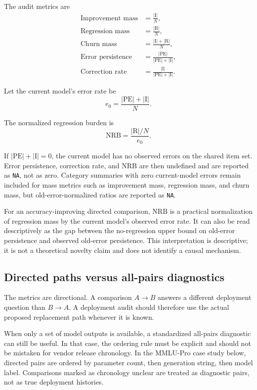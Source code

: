 \documentclass[manuscript, screen, review, nonacm]{jair}
\newcommand{\pe}{\mathrm{PE}}
\newcommand{\imp}{\mathrm{I}}
\newcommand{\reg}{\mathrm{R}}
\newcommand{\nrb}{\mathrm{NRB}}
\begin{document}
The audit metrics are
\begin{align}
\text{Improvement mass} &= \frac{|\imp|}{N}, \\
\text{Regression mass} &= \frac{|\reg|}{N}, \\
\text{Churn mass} &= \frac{|\imp|+|\reg|}{N}, \\
\text{Error persistence} &= \frac{|\pe|}{|\pe|+|\imp|}, \\
\text{Correction rate} &= \frac{|\imp|}{|\pe|+|\imp|}.
\end{align}

Let the current model's error rate be
\begin{equation}
 e_0 = \frac{|\pe|+|\imp|}{N}.
\end{equation}

The normalized regression burden is
\begin{equation}
 \nrb = \frac{|\reg|/N}{e_0}.
\end{equation}

If $|\pe|+|\imp|=0$, the current model has no observed errors on the shared item set. Error persistence, correction rate, and $\nrb$ are then undefined and are reported as \texttt{NA}, not as zero. Category summaries with zero current-model errors remain included for mass metrics such as improvement mass, regression mass, and churn mass, but old-error-normalized ratios are reported as \texttt{NA}.

For an accuracy-improving directed comparison, $\nrb$ is a practical normalization of regression mass by the current model's observed error rate. It can also be read descriptively as the gap between the no-regression upper bound on old-error persistence and observed old-error persistence. This interpretation is descriptive; it is not a theoretical novelty claim and does not identify a causal mechanism.

\subsection{Directed paths versus all-pairs diagnostics}

The metrics are directional. A comparison $A \rightarrow B$ answers a different deployment question than $B \rightarrow A$. A deployment audit should therefore use the actual proposed replacement path whenever it is known.

When only a set of model outputs is available, a standardized all-pairs diagnostic can still be useful. In that case, the ordering rule must be explicit and should not be mistaken for vendor release chronology. In the MMLU-Pro case study below, directed pairs are ordered by parameter count, then generation string, then model label. Comparisons marked as chronology unclear are treated as diagnostic pairs, not as true deployment histories.
\end{document}
